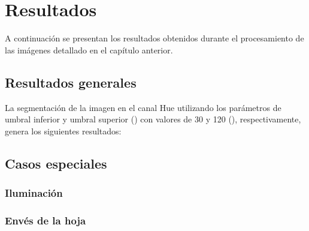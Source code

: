 \chapter{Resultados}
A continuación se presentan los resultados obtenidos durante el procesamiento de las imágenes detallado en el capítulo anterior.

\section{Resultados generales}
La segmentación de la imagen en el canal Hue utilizando los parámetros de umbral inferior y umbral superior () con valores de 30 y 120 (), respectivamente, genera los siguientes resultados:

\section{Casos especiales}
\subsection{Iluminación}
\subsection{Envés de la hoja}